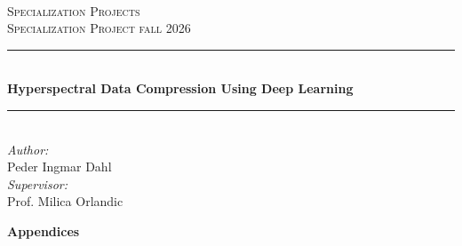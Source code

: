 \documentclass{article}
\newcommand{\HRule}{\rule{\linewidth}{0.5mm}}
\begin{document}
\begin{titlepage}
\vbox{ }
\vbox{ }
\begin{center}
\\[1cm]
\textsc{\LARGE Specialization Projects}\\[1cm]
\textsc{\Large Specialization Project fall 2026}\\[0.5cm]
\vbox{ }

\HRule \\[0.4cm]

{ \huge \bfseries Hyperspectral Data Compression Using Deep Learning}\\[0.4cm] 

\HRule \\[1.5cm]

\large
\emph{Author:}\\
Peder Ingmar Dahl \\[0.5cm]
\emph{Supervisor:} \\
Prof. Milica Orlandic \\[0.5cm]
\vfill

\end{center}
\end{titlepage}

\tableofcontents

\newpage

\newpage

\newpage

\newpage

\newpage

\newpage


\newpage
{}



\newpage
\vspace*{7 cm}
\begin{center}
\textbf{\Huge Appendices}
\end{center}

\end{document}
